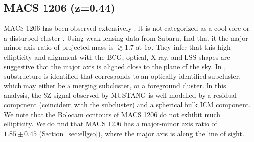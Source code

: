 \documentclass[iop,numberedappendix,apj]{emulateapj}
\begin{document}


\subsection{MACS 1206 (z=0.44)}
\label{sec:results_m1206}


MACS 1206 has been observed extensively \citep[e.g.][]{ebeling2001,ebeling2009,gilmour2009,umetsu2012,
zitrin2012a,biviano2013,sayers2013}. It is not categorized as a cool core or a disturbed cluster
\citep{sayers2013}. Using weak lensing data from Subaru, \citet{umetsu2012} find that it the major-minor 
axis ratio of projected mass is $\gtrsim 1.7$ at $1\sigma$. They infer that this high ellipticity and 
alignment with the BCG, optical, X-ray, and LSS shapes are suggestive that the major axis is aligned 
close to the plane of the sky. In \citet{young2014}, substructure is identified that corresponds to an 
optically-identified subcluster, which may either be a merging subcluster, or a foreground cluster. 
In this analysis, the SZ signal observed by MUSTANG is well modelled by a residual component (coincident 
with the subcluster) and a spherical bulk ICM component. We note that the Bolocam contours of MACS 1206
do not exhibit much ellipticity. We do find that MACS 1206 has a major-minor axis 
ratio of $1.85 \pm 0.45$ (Section~\ref{sec:ellgeo}), where the major axis is along the line of sight.


\end{document}
